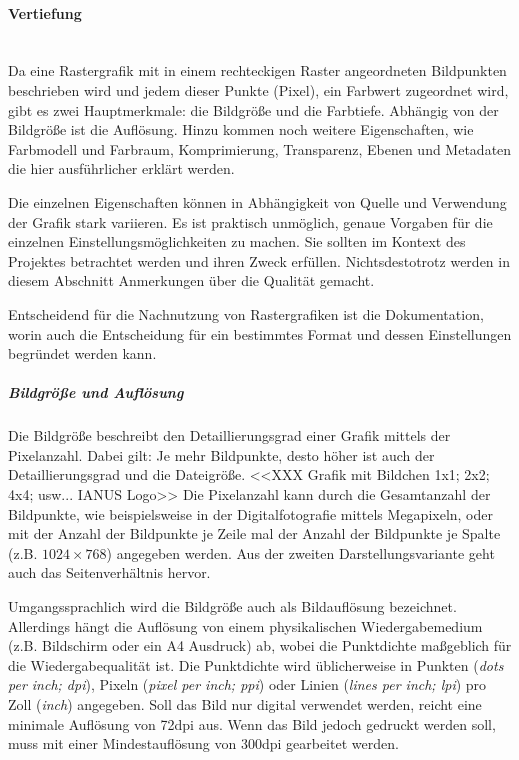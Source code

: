 \paragraph{Vertiefung} ~\\ 

Da eine Rastergrafik mit in einem rechteckigen Raster angeordneten Bildpunkten beschrieben wird und jedem dieser Punkte (Pixel), ein Farbwert zugeordnet wird, gibt es zwei Hauptmerkmale: die Bildgröße und die Farbtiefe. Abhängig von der Bildgröße ist die Auflösung. Hinzu kommen noch weitere Eigenschaften, wie Farbmodell und Farbraum, Komprimierung, Transparenz, Ebenen und Metadaten die hier ausführlicher erklärt werden. 

Die einzelnen Eigenschaften können in Abhängigkeit von Quelle und Verwendung der Grafik stark variieren. Es ist praktisch unmöglich, genaue Vorgaben für die einzelnen Einstellungsmöglichkeiten zu machen. Sie sollten im Kontext des Projektes betrachtet werden und ihren Zweck erfüllen. Nichtsdestotrotz werden in diesem Abschnitt Anmerkungen über die Qualität gemacht.

Entscheidend für die Nachnutzung von Rastergrafiken ist die Dokumentation, worin auch die Entscheidung für ein bestimmtes Format und dessen Einstellungen begründet werden kann.


\subparagraph{Bildgröße und Auflösung}
Die Bildgröße beschreibt den Detaillierungsgrad einer Grafik mittels der Pixelanzahl. Dabei gilt: Je mehr Bildpunkte, desto höher ist auch der Detaillierungsgrad und die Dateigröße. <<XXX Grafik mit Bildchen 1x1; 2x2; 4x4; usw... IANUS Logo>> Die Pixelanzahl kann durch die Gesamtanzahl der Bildpunkte, wie beispielsweise in der Digitalfotografie mittels Megapixeln, oder mit der Anzahl der Bildpunkte je Zeile mal der Anzahl der Bildpunkte je Spalte (z.B. $1024 \times 768$) angegeben werden. Aus der zweiten Darstellungsvariante geht auch das Seitenverhältnis hervor.

Umgangssprachlich wird die Bildgröße auch als Bildauflösung bezeichnet. Allerdings hängt die Auflösung von einem physikalischen Wiedergabemedium (z.B. Bildschirm oder ein A4 Ausdruck) ab, wobei die Punktdichte maßgeblich für die Wiedergabequalität ist. Die Punktdichte wird üblicherweise in Punkten (\emph{dots per inch; dpi}), Pixeln (\emph{pixel per inch; ppi}) oder Linien (\emph{lines per inch; lpi}) pro Zoll (\emph{inch}) angegeben. Soll das Bild nur digital verwendet werden, reicht eine minimale Auflösung von 72dpi aus. Wenn das Bild jedoch gedruckt werden soll, muss mit einer Mindestauflösung von 300dpi gearbeitet werden.

